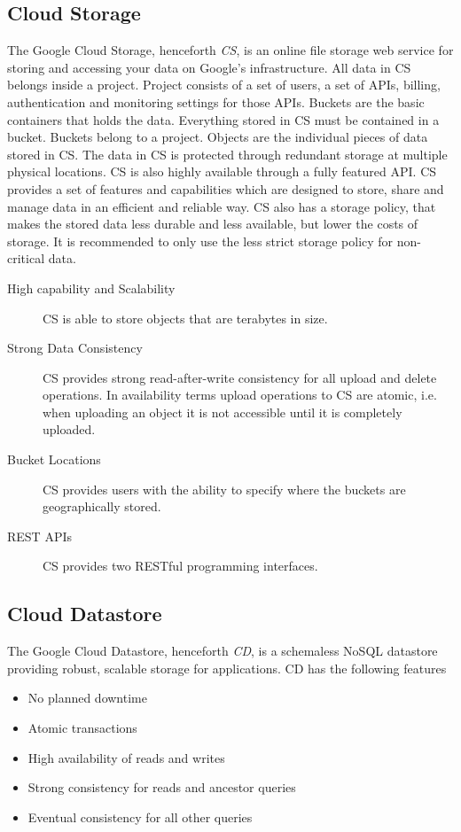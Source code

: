 \documentclass[11pt]{report}
\begin{document}
\subsection{Cloud Storage}
The Google Cloud Storage, henceforth \emph{CS}, is an online file storage web service for storing and accessing your data on Google's infrastructure. All data in CS belongs inside a project. Project consists of a set of users, a set of APIs, billing, authentication and monitoring settings for those APIs. Buckets are the basic containers that holds the data. Everything stored in CS must be contained in a bucket. Buckets belong to a project. Objects are the individual pieces of data stored in CS. The data in CS is protected through redundant storage at multiple physical locations. CS is also highly available through a fully featured API. CS provides a set of features and capabilities which are designed to store, share and manage data in an efficient and reliable way. CS also has a storage policy, that makes the stored data less durable and less available, but lower the costs of storage. It is recommended to only use the less strict storage policy for non-critical data.

\begin{description}
\item[High capability and Scalability] CS is able to store objects that are terabytes in size.
\item[Strong Data Consistency] CS provides strong read-after-write consistency for all upload and delete operations. In availability terms upload operations to CS are atomic, i.e. when uploading an object it is not accessible until it is completely uploaded.
\item[Bucket Locations] CS provides users with the ability to specify where the buckets are geographically stored.
\item[REST APIs] CS provides two RESTful programming interfaces.
\end{description}

\subsection{Cloud Datastore}
The Google Cloud Datastore, henceforth \emph{CD}, is a schemaless NoSQL datastore providing robust, scalable storage for applications. CD has the following features

\begin{itemize}
\item No planned downtime
\item Atomic transactions
\item High availability of reads and writes
\item Strong consistency for reads and ancestor queries
\item Eventual consistency for all other queries
\end{itemize}
\end{document}
